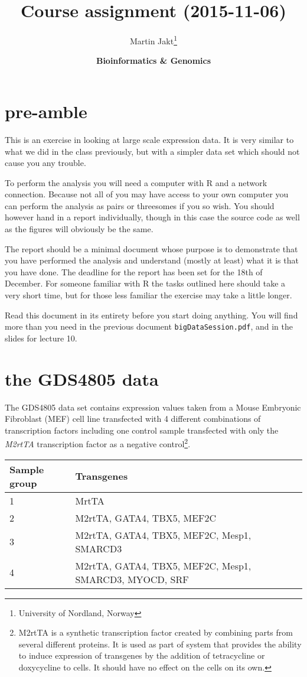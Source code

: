 \documentclass[11pt]{article}
\author{Martin Jakt\thanks{University of Nordland, Norway}}
\date{\textbf{Bioinformatics \& Genomics}}
\title{\textbf{Course assignment} (2015-11-06)}
\begin{document}
\maketitle

\section{pre-amble}
\label{preamble}
This is an exercise in looking at large scale expression data. It is very
similar to what we did in the class previously, but with a simpler data set
which should not cause you any trouble.

To perform the analysis you will need a computer with R and a network connection.
Because not all of you may have access to your own computer you can perform the
analysis as pairs or threesomes if you so wish. You should however hand in a report
individually, though in this case the source code as well as the figures will
obviously be the same.

The report should be a minimal document whose purpose is to demonstrate that you
have performed the analysis and understand (mostly at least) what it is that you
have done. The deadline for the report has been set for the 18th of December. For 
someone familiar with R the tasks outlined here should take a very short time, but
for those less familiar the exercise may take a little longer.

Read this document in its entirety before you start doing anything. You will find
more than you need in the previous document \texttt{bigDataSession.pdf}, and in
the slides for lecture 10.

\section{the GDS4805 data}
\label{datasec}
The GDS4805 data set contains expression values taken from
a Mouse Embryonic Fibroblast (MEF) cell line transfected with
4 different combinations of transcription factors including
one control sample transfected with only the \emph{M2rtTA} transcription
factor as a negative control\footnote{M2rtTA is a synthetic transcription
factor created by combining parts from several different proteins. It is used
as part of system that provides the ability to induce expression of transgenes by the addition
of tetracycline or doxycycline to cells. It should have no effect on the cells on
its own.}.

\begin{tabular}{l|l}
Sample group & Transgenes \\
\hline
1 & MrtTA \\
2 & M2rtTA, GATA4, TBX5, MEF2C \\
3 & M2rtTA, GATA4, TBX5, MEF2C, Mesp1, SMARCD3 \\
4 & M2rtTA, GATA4, TBX5, MEF2C, Mesp1, SMARCD3, MYOCD, SRF \\
\end{tabular}
\end{document}

